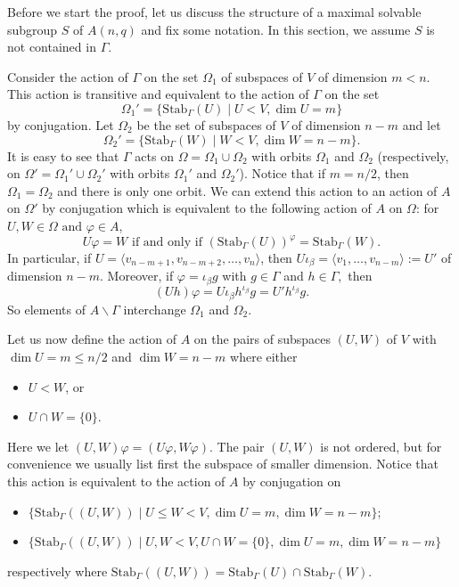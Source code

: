 \documentclass[a4paper,reqno,11pt]{amsart}
\theoremstyle{definition}
\theoremstyle{remark}
\numberwithin{equation}{section}
\begin{document}
Before we start the proof, let us discuss the structure of a maximal solvable subgroup
$S$ of $A(n,q)$ and fix some notation. In this section, we assume  $S$ is not contained in $\Gamma.$

Consider the action of $\Gamma$ on the set $\Omega_1$ of subspaces of $V$ of dimension $m<n.$ This action is transitive and equivalent to the action of $\Gamma$ on the set
$$\Omega_1'=\{\mathrm{Stab}_{\Gamma}(U) \mid U<V, \dim U= m\}$$ by conjugation. Let $\Omega_2$ be the set of subspaces of $V$ of dimension $n-m$ and let  $$\Omega_2'=\{\mathrm{Stab}_{\Gamma}(W) \mid W<V, \dim W= n-m\}.$$ It is easy to see that $\Gamma$ acts on $\Omega=\Omega_1 \cup \Omega_2$ with orbits $\Omega_1$ and $\Omega_2$ (respectively, on $\Omega'=\Omega_1' \cup \Omega_2'$ with orbits $\Omega_1'$ and $\Omega_2'$). Notice that if $m=n/2$, then $\Omega_1=\Omega_2$ and there is only one orbit. We can extend this action to an action of $A$ on $\Omega'$ by conjugation which is equivalent to the following action of $A$ on $\Omega$:  for $U,W \in \Omega \text{ and } \varphi \in A$,
$$ U\varphi =W \text{ if and only if } 
(\mathrm{Stab}_{\Gamma}(U))^{\varphi}=\mathrm{Stab}_{\Gamma}(W).$$ 
In particular, if $U= \langle v_{n-m+1}, v_{n-m+2}, \ldots, v_n \rangle$, then $U\iota_{\beta}=\langle v_1, \ldots, v_{n-m}\rangle:=U'$ of dimension $n-m.$ Moreover, if $\varphi=\iota_{\beta}g$ with $g \in \Gamma$ and $h \in \Gamma,$ then 
$$(Uh)\varphi=U\iota_{\beta}h^{\iota_{\beta}}g=U'h^{\iota_{\beta}}g.$$  So elements of $A\backslash \Gamma$ interchange $\Omega_1$ and $\Omega_2.$

Let us now define the action of $A$ on the pairs of subspaces $(U,W)$ of $V$ with $\dim U=m \le n/2$ and $\dim W=n-m$ where either
\begin{itemize}
\item  $U<W$, or
\item $U\cap W= \{0\}.$
\end{itemize}
 Here we let $(U,W) \varphi =(U\varphi, W \varphi).$ The pair $(U, W)$ is not ordered, but for convenience we usually list first the subspace of smaller dimension.  Notice that this action is equivalent to the action of $A$ by conjugation on 
 \begin{itemize}
\item {$\{\mathrm{Stab}_{\Gamma}((U,W)) \mid U \le W < V, \dim U=m, \dim W=n-m\}$};
\item $\{\mathrm{Stab}_{\Gamma}((U,W)) \mid U , W < V, U \cap W = \{0\}, \dim U=m, \dim W=n-m\}$ 
 \end{itemize}
respectively
where $\mathrm{Stab}_{\Gamma}((U,W))=\mathrm{Stab}_{\Gamma}(U) \cap \mathrm{Stab}_{\Gamma}(W).$ 
\end{document}
